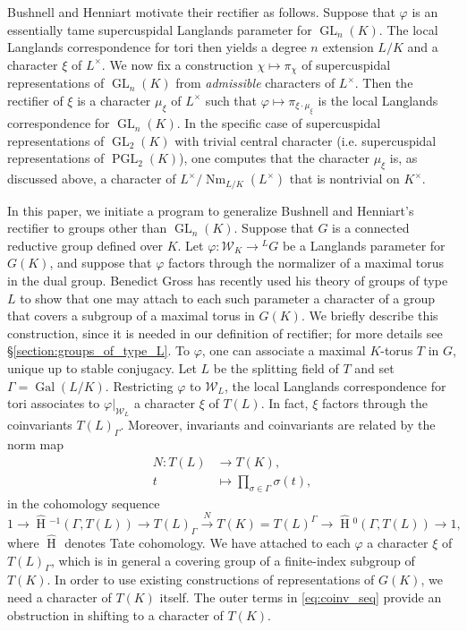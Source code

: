 \documentclass{mrlart7}
\theoremstyle{plain}
\newcommand{\HT}[1]{\hat{\HH}{}^{#1}}
\theoremstyle{definition}
\numberwithin{equation}{section}
\DeclareMathOperator{\Gal}{Gal}
\DeclareMathOperator{\HH}{H}
\DeclareMathOperator{\Nm}{Nm}
\DeclareMathOperator{\GL}{GL}
\DeclareMathOperator{\PGL}{PGL}
\newcommand{\Kx}{K^\times}
\newcommand{\Lx}{L^\times}
\newcommand{\Weil}{\mathcal{W}}
\begin{document}
Bushnell and Henniart motivate their rectifier as follows.
Suppose that $\varphi$ is an essentially tame supercuspidal Langlands parameter for
$\GL_n(K)$.  The local Langlands correspondence for tori then yields a degree $n$ extension
$L/K$ and a character $\xi$ of $L^{\times}$.  We now fix a construction $\chi \mapsto \pi_{\chi}$
of supercuspidal representations of $\GL_n(K)$ from \emph{admissible} characters of $L^{\times}$.
Then the rectifier of $\xi$ is a character $\mu_{\xi}$ of $L^{\times}$ such that
$\varphi \mapsto \pi_{\xi \cdot \mu_{\xi}}$ is the local Langlands correspondence for $\GL_n(K)$.
In the specific case of supercuspidal representations of $\GL_2(K)$ with trivial central character
(i.e. supercuspidal representations of $\PGL_2(K)$), one computes that the character $\mu_{\xi}$ is,
as discussed above, a character of $\Lx / \Nm_{L/K}(\Lx)$ that is nontrivial on $\Kx$.

In this paper, we initiate a program to generalize Bushnell and Henniart's
rectifier to groups other than $\GL_n(K)$. Suppose that $G$ is a connected reductive group defined over $K$.
Let $\varphi : \Weil_K \rightarrow {}^L G$ be a
Langlands parameter for $G(K)$, and suppose that $\varphi$ factors
through the normalizer of a maximal torus in the dual group.
Benedict Gross has recently used his theory of groups of type $L$ to show that one may attach to each such parameter a character of a group that covers a subgroup of a maximal torus in $G(K)$.  We briefly describe this construction, since it is needed in our definition of rectifier; for more details see \S \ref{section:groups_of_type_L}.
To $\varphi$, one can associate a maximal $K$-torus $T$ in $G$, unique up to
stable conjugacy.  Let $L$ be the splitting field of $T$ and set $\Gamma = \Gal(L/K)$.
Restricting $\varphi$ to $\Weil_L$, the local Langlands correspondence for tori associates to $\varphi|_{\Weil_L}$ a character $\xi$ of $T(L)$.  In fact, $\xi$ factors through the coinvariants $T(L)_{\Gamma}$.
Moreover, invariants and coinvariants are related by the norm map
\begin{align*}
N : T(L) &\rightarrow T(K),\\
t &\mapsto \displaystyle\prod_{\sigma \in \Gamma} \sigma(t),
\end{align*}
in the cohomology sequence
\begin{equation} \label{eq:coinv_seq}
1 \rightarrow \HT{-1}(\Gamma,T(L)) \rightarrow T(L)_{\Gamma} \xrightarrow{N} T(K) = T(L)^{\Gamma} \rightarrow \HT{0}(\Gamma,T(L)) \rightarrow 1,
\end{equation}
where $\HT{}$ denotes Tate cohomology.  We have attached to each $\varphi$ a character $\xi$ of $T(L)_{\Gamma}$, which is in general a covering group of a finite-index subgroup of $T(K)$.  In order to use existing constructions of representations of $G(K)$, we need a character of $T(K)$ itself.  The outer terms in \eqref{eq:coinv_seq} provide an obstruction in shifting to a character of $T(K)$.
\end{document}
